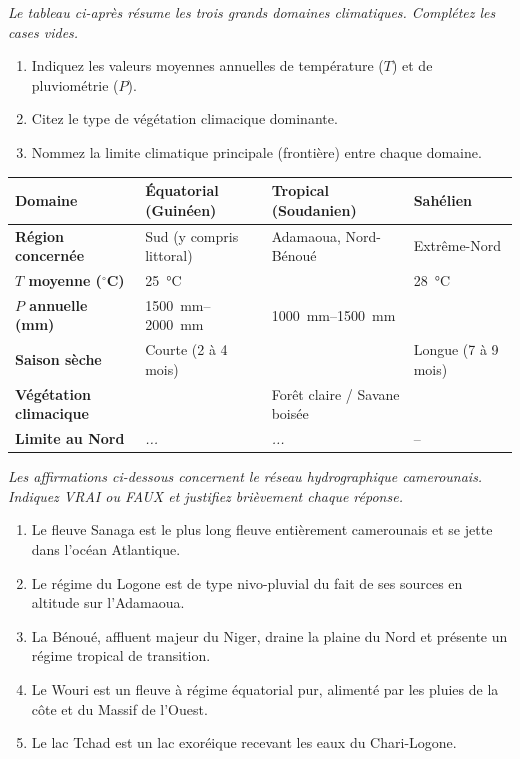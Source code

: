\documentclass[11pt]{article}
\begin{document}
\begin{exercice}
\emph{Le tableau ci-après résume les trois grands domaines climatiques. Complétez les cases vides.}
\begin{enumerate}
    \item Indiquez les valeurs moyennes annuelles de température ($T$) et de pluviométrie ($P$).
    \item Citez le type de végétation climacique dominante.
    \item Nommez la limite climatique principale (frontière) entre chaque domaine.
\end{enumerate}
\begin{tabularx}{\linewidth}{|>{\bfseries}l|X|X|X|}
\hline
\textbf{Domaine} & \textbf{Équatorial (Guinéen)} & \textbf{Tropical (Soudanien)} & \textbf{Sahélien} \\
\hline
Région concernée & Sud (y compris littoral) & Adamaoua, Nord-Bénoué & Extrême-Nord \\
\hline
$T$ moyenne ($^\circ$C) & \SI{25}{\celsius} & & \SI{28}{\celsius} \\
\hline
$P$ annuelle (mm) & \SIrange{1500}{2000}{\milli\meter} & \SIrange{1000}{1500}{\milli\meter} & \\
\hline
Saison sèche & Courte (2 à 4 mois) & & Longue (7 à 9 mois) \\
\hline
Végétation climacique & & Forêt claire / Savane boisée & \\
\hline
Limite au Nord & \textit{...} & \textit{...} & -- \\
\hline
\end{tabularx}
\end{exercice}

\begin{exercice}
\emph{Les affirmations ci-dessous concernent le réseau hydrographique camerounais. Indiquez VRAI ou FAUX et justifiez brièvement chaque réponse.}
\begin{enumerate}
    \item Le fleuve Sanaga est le plus long fleuve entièrement camerounais et se jette dans l'océan Atlantique.
    \item Le régime du Logone est de type nivo-pluvial du fait de ses sources en altitude sur l'Adamaoua.
    \item La Bénoué, affluent majeur du Niger, draine la plaine du Nord et présente un régime tropical de transition.
    \item Le Wouri est un fleuve à régime équatorial pur, alimenté par les pluies de la côte et du Massif de l'Ouest.
    \item Le lac Tchad est un lac exoréique recevant les eaux du Chari-Logone.
\end{enumerate}
\end{exercice}
\end{document}
